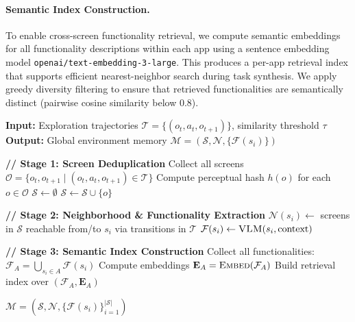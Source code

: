 \documentclass{article} %
\begin{document}
\paragraph{Semantic Index Construction.}
To enable cross-screen functionality retrieval, we compute semantic embeddings for all functionality descriptions within each app using a sentence embedding model \texttt{openai/text-embedding-3-large}. This produces a per-app retrieval index that supports efficient nearest-neighbor search during task synthesis. We apply greedy diversity filtering to ensure that retrieved functionalities are semantically distinct (pairwise cosine similarity below 0.8).

\begin{algorithm}[t]
\caption{Global Environment Memory Construction}
\label{alg:memory_construction}
\begin{algorithmic}[1]
\State \textbf{Input:}  Exploration trajectories $\mathcal{T} = \{(o_t, a_t, o_{t+1})\}$, similarity threshold $\tau$
\State \textbf{Output:} Global environment memory $\mathcal{M} = (\mathcal{S}, \mathcal{N}, \{\mathcal{F}(s_i)\})$

\Statex \textbf{// Stage 1: Screen Deduplication}
\State Collect all screens $\mathcal{O} = \{o_t, o_{t+1} \mid (o_t, a_t, o_{t+1}) \in \mathcal{T}\}$
\State Compute perceptual hash $h(o)$ for each $o \in \mathcal{O}$
\State $\mathcal{S} \gets \emptyset$
        \State $\mathcal{S} \gets \mathcal{S} \cup \{o\}$ 
    \EndIf
\EndFor

\Statex \textbf{// Stage 2: Neighborhood \& Functionality Extraction}
    \State $\mathcal{N}(s_i) \gets$ screens in $\mathcal{S}$ reachable from/to $s_i$ via transitions in $\mathcal{T}$
    \State $\mathcal{F}(s_i) \gets \textsc{VLM}(s_i, \text{context})$ 
\EndFor

\Statex \textbf{// Stage 3: Semantic Index Construction}
    \State Collect all functionalities: $\mathcal{F}_A = \bigcup_{s_i \in A} \mathcal{F}(s_i)$
    \State Compute embeddings $\mathbf{E}_A = \textsc{Embed}(\mathcal{F}_A)$
    \State Build retrieval index over $(\mathcal{F}_A, \mathbf{E}_A)$
\EndFor

\State \Return $\mathcal{M} = (\mathcal{S}, \mathcal{N}, \{\mathcal{F}(s_i)\}_{i=1}^{|\mathcal{S}|})$
\end{algorithmic}
\end{algorithm}
\end{document}
